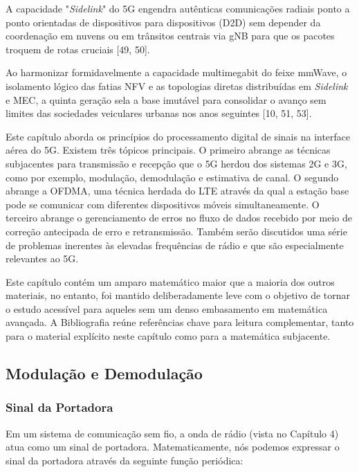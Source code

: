 A capacidade "\textit{Sidelink}" do \gls{5G} engendra autênticas comunicações radiais ponto a ponto orientadas de dispositivos para dispositivos (\gls{D2D}) sem depender da coordenação em nuvens ou em trânsitos centrais via \gls{gNB} para que os pacotes troquem de rotas cruciais [49, 50].

Ao harmonizar formidavelmente a capacidade multimegabit do feixe \gls{mmWave}, o isolamento lógico das fatias \gls{NFV} e as topologias diretas distribuídas em \textit{Sidelink} e \gls{MEC}, a quinta geração sela a base imutável para consolidar o avanço sem limites das sociedades veiculares urbanas nos anos seguintes [10, 51, 53].

Este capítulo aborda os princípios do processamento digital de sinais na interface aérea do \gls{5G}. Existem três tópicos principais. O primeiro abrange as técnicas subjacentes para transmissão e recepção que o \gls{5G} herdou dos sistemas 2G e 3G, como por exemplo, modulação, demodulação e estimativa de canal. O segundo abrange a \gls{OFDMA}, uma técnica herdada do \gls{LTE} através da qual a estação base pode se comunicar com diferentes dispositivos móveis simultaneamente. O terceiro abrange o gerenciamento de erros no fluxo de dados recebido por meio de correção antecipada de erro e retransmissão. Também serão discutidos uma série de problemas inerentes às elevadas frequências de rádio e que são especialmente relevantes ao \gls{5G}.

Este capítulo contém um amparo matemático maior que a maioria dos outros materiais, no entanto, foi mantido deliberadamente leve com o objetivo de tornar o estudo acessível para aqueles sem um denso embasamento em matemática avançada. A Bibliografia reúne referências chave para leitura complementar, tanto para o material explícito neste capítulo como para a matemática subjacente.

\subsection{Modulação e Demodulação}

\subsubsection{Sinal da Portadora}
Em um sistema de comunicação sem fio, a onda de rádio (vista no Capítulo 4) atua como um sinal de portadora. Matematicamente, nós podemos expressar o sinal da portadora através da seguinte função periódica: